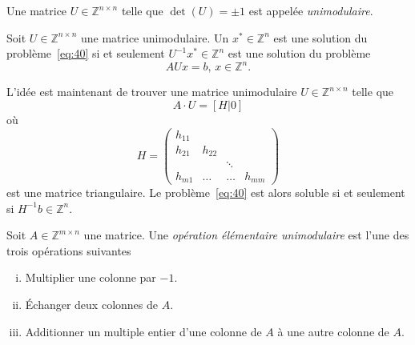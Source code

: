  \begin{definition}
    \label{def:46}
    Une matrice $U ∈ℤ^{n ×n}$ telle que $\det(U) = \pm 1$ est appelée  \emph{unimodulaire}.
  \end{definition}

  \begin{remark}
    Soit $U ∈ℤ^{n ×n}$  une matrice unimodulaire. 
    Un $x^* ∈ ℤ^n$ est une solution du problème~\eqref{eq:40} si et seulement $U^{-1} x^*∈ ℤ^n$ est une solution du problème
    \begin{equation}
      \label{eq:42}
      A U x = b, \, x ∈ℤ^n. 
    \end{equation}
  \end{remark}
L'idée est maintenant de trouver une matrice unimodulaire $U ∈ℤ^{n ×n}$ telle que
\begin{equation}
  \label{eq:44}
  A ⋅ U = [H | 0]
\end{equation}
où
\begin{displaymath}
  H =
  \begin{pmatrix}
    h_{11} \\
    h_{21} & h_{22}\\
    &  & \ddots \\
    h_{m1} & \hdots & \hdots & h_{mm}
  \end{pmatrix}
\end{displaymath}
est une matrice triangulaire. Le problème~\eqref{eq:40} est alors soluble si et seulement si
$H^{-1} b ∈ℤ^n$.

\begin{definition}
  \label{def:47}
  Soit $A ∈ ℤ^{m ×n}$ une matrice. Une \emph{opération élémentaire unimodulaire} est l'une des trois opérations suivantes
  \begin{enumerate}[i)]
    \item Multiplier une colonne par $-1$.  \label{item:21}
    \item Échanger deux colonnes de $A$.  \label{item:22}
    \item Additionner un multiple entier d'une colonne de $A$ à une autre colonne de $A$. \label{item:23}
  \end{enumerate}
\end{definition}



